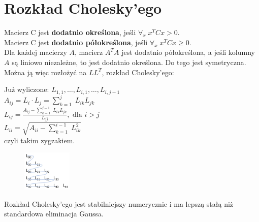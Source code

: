 \section{Rozkład Cholesky’ego}
Macierz C jest \textbf{dodatnio określona}, jeśli \( \forall_x\; x^TCx > 0 \). \\
Macierz C jest \textbf{dodatnio półokreślona}, jeśli \( \forall_x\; x^TCx \geq 0 \). \\
Dla każdej macierzy \( A \), macierz \( A^TA \) jest dodatnio półokreślona, a jeśli kolumny \( A \) są liniowo niezależne, to jest dodatnio określona. Do tego jest symetryczna. Można ją więc rozłożyć na \( LL^T \), rozkład Cholesky'ego:
\begin{multicols}{2}
\noindent
Już wyliczone: \( L_{1,1}, \dots, L_{i,1}, \dots, L_{i, j-1} \) \\
\( A_{ij} = L_i \cdot L_j = \sum_{k=1}^{j}\; L_{ik}L_{jk} \) \\
\( L_{ij} = \frac{A_{ij} - \sum_{k=1}^{j-1}\; L_{ik}L_{jk}}{L_{jj}}, \text{ dla } i > j \) \\
\( L_{ii} = \sqrt{A_{ii} - \sum_{k=1}^{i-1}\; L_{ik}^2} \) \\
\columnbrake
czyli takim zygzakiem.
\begin{figure}[H]
    \includegraphics[width=0.21\textwidth]{img/cholesky.png}
\end{figure}
\end{multicols}
\noindent
Rozkład Cholesky’ego jest stabilniejszy numerycznie i ma lepszą stałą niż standardowa eliminacja Gaussa.